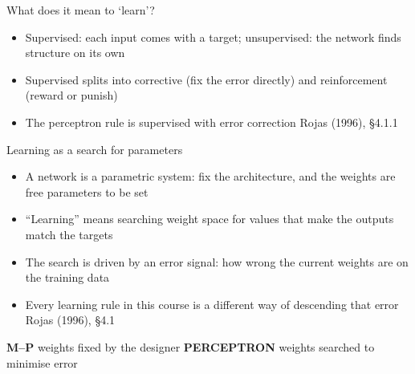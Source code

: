 \documentclass[aspectratio=169, 11pt]{beamer}
\newcommand{\mppar}[2]{%
  \vfill
  {\footnotesize
  \begin{tcolorbox}[enhanced, sidebyside, sidebyside align=top,
                    lefthand ratio=0.485,
                    segmentation style={mpc!35, line width=0.6pt},
                    colback=mpc!5, colframe=mpc!35, boxrule=0.5pt,
                    arc=1.5mm, left=2mm, right=2mm, top=0.8mm, bottom=0.8mm]
    {\color{mpc}\textbf{M--P}}\;\; #1
  \tcblower
    {\color{pcc}\textbf{PERCEPTRON}}\;\; #2
  \end{tcolorbox}}%
  \vspace{0.6em}%
}
\newcommand{\src}[3]{}      %
\begin{document}
\begin{frame}{What does it mean to `learn'?}
  \src{rojas1996}{figure}{4.3}
  \src{rojas1996}{section}{4.1.1}
  \centering
  \vspace{0.5em}
  \begin{itemize}\setlength{\itemsep}{1pt}
    \item \alert{Supervised}: each input comes with a target;
          \alert{unsupervised}: the network finds structure
          on its own
    \item Supervised splits into \alert{corrective} (fix the
          error directly) and \alert{reinforcement} (reward
          or punish)
    \item The \alert{perceptron} rule is supervised with
          error correction
          \hfill{\scriptsize Rojas (1996), \S4.1.1}
  \end{itemize}
\end{frame}

\begin{frame}{Learning as a search for parameters}
  \src{rojas1996}{section}{4.1}
  \begin{itemize}
    \item A network is a \alert{parametric system}: fix the
          architecture, and the weights are \alert{free
          parameters} to be set
    \item ``Learning'' means \alert{searching} weight space
          for values that make the outputs match the targets
    \item The search is driven by an \alert{error signal}:
          how wrong the current weights are on the training
          data
    \item Every learning rule in this course is a different
          way of \alert{descending} that error
          \hfill{\scriptsize Rojas (1996), \S4.1}
  \end{itemize}
  \mppar{weights fixed by the designer}
        {weights \alert{searched} to minimise error}
\end{frame}
\end{document}
